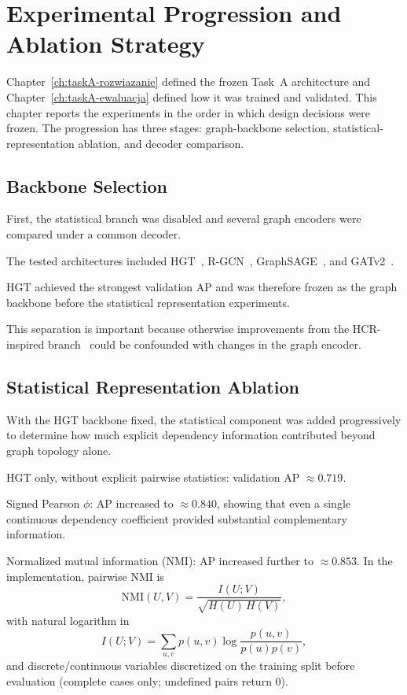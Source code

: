 \chapter{Experimental Progression and Ablation Strategy}
\label{ch:taskA-benchmark}

Chapter~\ref{ch:taskA-rozwiazanie} defined the frozen Task~A architecture and Chapter~\ref{ch:taskA-ewaluacja} defined how it was trained and validated.
This chapter reports the experiments in the order in which design decisions were frozen.
The progression has three stages: graph-backbone selection, statistical-representation ablation, and decoder comparison.

\section{Backbone Selection}
\label{sec:taskA-stage-a}

First, the statistical branch was disabled and several graph encoders were compared under a common decoder.

The tested architectures included HGT~\cite{hu2020hgt}, R-GCN~\cite{schlichtkrull2018rgcn}, GraphSAGE~\cite{hamilton2017graphsage}, and GATv2~\cite{brody2022gatv2}.

HGT achieved the strongest validation AP and was therefore frozen as the graph backbone before the statistical representation experiments.

This separation is important because otherwise improvements from the HCR-inspired branch~\cite{duda2018hcr,duda2018hcr-ts,duda2020hcr-income} could be confounded with changes in the graph encoder.

\section{Statistical Representation Ablation}
\label{sec:taskA-stage-c}

With the HGT backbone fixed, the statistical component was added progressively to determine how much explicit dependency information contributed beyond graph topology alone.

HGT only, without explicit pairwise statistics: validation AP $\approx 0.719$.

Signed Pearson $\phi$: AP increased to $\approx 0.840$, showing that even a single continuous dependency coefficient provided substantial complementary information.

Normalized mutual information (NMI): AP increased further to $\approx 0.853$.
In the implementation, pairwise NMI is
\begin{equation}
\label{eq:taskA-nmi}
\mathrm{NMI}(U,V)=\frac{I(U;V)}{\sqrt{H(U)\,H(V)}},
\end{equation}
with natural logarithm in
\begin{equation}
I(U;V)=\sum_{u,v}p(u,v)\log\frac{p(u,v)}{p(u)p(v)},
\end{equation}
and discrete/continuous variables discretized on the training split before evaluation (complete cases only; undefined pairs return $0$).

